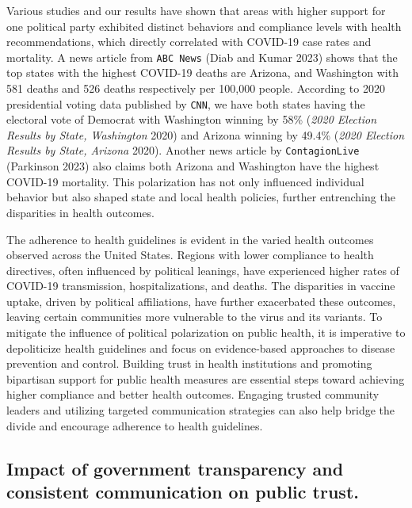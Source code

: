 \documentclass[
  letterpaper,
  DIV=11,
  numbers=noendperiod]{scrartcl}
\begin{document}
Various studies and our results have shown that areas with higher
support for one political party exhibited distinct behaviors and
compliance levels with health recommendations, which directly correlated
with COVID-19 case rates and mortality. A news article from
\texttt{ABC\ News} (Diab and Kumar 2023) shows that the top states with
the highest COVID-19 deaths are Arizona, and Washington with 581 deaths
and 526 deaths respectively per 100,000 people. According to 2020
presidential voting data published by \texttt{CNN}, we have both states
having the electoral vote of Democrat with Washington winning by 58\%
(\emph{2020 Election Results by State, Washington} 2020) and Arizona
winning by 49.4\% (\emph{2020 Election Results by State, Arizona} 2020).
Another news article by \texttt{ContagionLive} (Parkinson 2023) also
claims both Arizona and Washington have the highest COVID-19 mortality.
This polarization has not only influenced individual behavior but also
shaped state and local health policies, further entrenching the
disparities in health outcomes.

The adherence to health guidelines is evident in the varied health
outcomes observed across the United States. Regions with lower
compliance to health directives, often influenced by political leanings,
have experienced higher rates of COVID-19 transmission,
hospitalizations, and deaths. The disparities in vaccine uptake, driven
by political affiliations, have further exacerbated these outcomes,
leaving certain communities more vulnerable to the virus and its
variants. To mitigate the influence of political polarization on public
health, it is imperative to depoliticize health guidelines and focus on
evidence-based approaches to disease prevention and control. Building
trust in health institutions and promoting bipartisan support for public
health measures are essential steps toward achieving higher compliance
and better health outcomes. Engaging trusted community leaders and
utilizing targeted communication strategies can also help bridge the
divide and encourage adherence to health guidelines.

\hypertarget{impact-of-government-transparency-and-consistent-communication-on-public-trust.}{%
\subsection{Impact of government transparency and consistent
communication on public
trust.}\label{impact-of-government-transparency-and-consistent-communication-on-public-trust.}}
\end{document}
